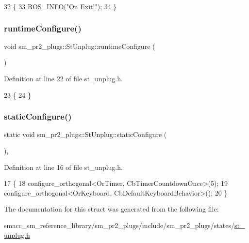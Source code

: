\begin{DoxyCode}
32     \{
33         ROS\_INFO(\textcolor{stringliteral}{"On Exit!"});
34     \}
\end{DoxyCode}
\mbox{\label{structsm__pr2__plugs_1_1StUnplug_a9a9dac6ed575453e3bbfb115f99277be}} 
\subsubsection{\texorpdfstring{runtime\+Configure()}{runtimeConfigure()}}
{\footnotesize\ttfamily void sm\+\_\+pr2\+\_\+plugs\+::\+St\+Unplug\+::runtime\+Configure (\begin{DoxyParamCaption}{ }\end{DoxyParamCaption})\hspace{0.3cm}{\ttfamily [inline]}}



Definition at line 22 of file st\+\_\+unplug.\+h.


\begin{DoxyCode}
23     \{
24     \}
\end{DoxyCode}
\mbox{\label{structsm__pr2__plugs_1_1StUnplug_aef539ea0c8d9ebf2ee46a69ca5db75be}} 
\subsubsection{\texorpdfstring{static\+Configure()}{staticConfigure()}}
{\footnotesize\ttfamily static void sm\+\_\+pr2\+\_\+plugs\+::\+St\+Unplug\+::static\+Configure (\begin{DoxyParamCaption}{ }\end{DoxyParamCaption})\hspace{0.3cm}{\ttfamily [inline]}, {\ttfamily [static]}}



Definition at line 16 of file st\+\_\+unplug.\+h.


\begin{DoxyCode}
17     \{
18         configure\_orthogonal<OrTimer,  CbTimerCountdownOnce>(5);    
19         configure\_orthogonal<OrKeyboard, CbDefaultKeyboardBehavior>();
20     \}
\end{DoxyCode}


The documentation for this struct was generated from the following file\+:\begin{DoxyCompactItemize}
\item 
smacc\+\_\+sm\+\_\+reference\+\_\+library/sm\+\_\+pr2\+\_\+plugs/include/sm\+\_\+pr2\+\_\+plugs/states/\hyperlink{st__unplug_8h}{st\+\_\+unplug.\+h}\end{DoxyCompactItemize}
